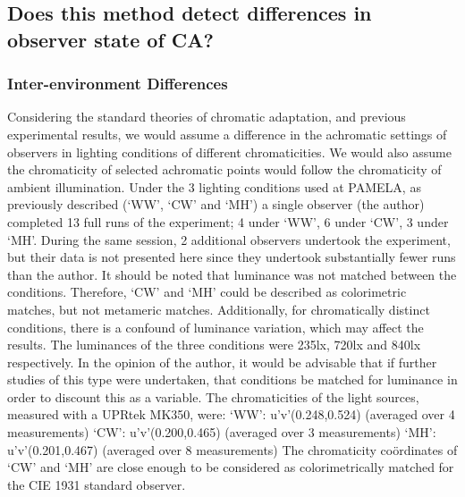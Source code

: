\subsection{Does this method detect differences in observer state of CA?}
\subsubsection{Inter-environment Differences}

Considering the standard theories of chromatic adaptation, and previous experimental results, we would assume a difference in the achromatic settings of observers in lighting conditions of different chromaticities. We would also assume the chromaticity of selected achromatic points would follow the chromaticity of ambient illumination.
Under the 3 lighting conditions used at PAMELA, as previously described (`WW', `CW' and `MH') a single observer (the author) completed 13 full runs of the experiment; 4 under `WW', 6 under `CW', 3 under `MH'. During the same session, 2 additional observers undertook the experiment, but their data is not presented here since they undertook substantially fewer runs than the author. It should be noted that luminance was not matched between the conditions. Therefore, `CW' and `MH' could be described as colorimetric matches, but not metameric matches. Additionally, for chromatically distinct conditions, there is a confound of luminance variation, which may affect the results. The luminances of the three conditions were 235lx, 720lx and 840lx respectively. In the opinion of the author, it would be advisable that if further studies of this type were undertaken, that conditions be matched for luminance in order to discount this as a variable. 
The chromaticities of the light sources, measured with a UPRtek MK350, were:
`WW': 	u'v'(0.248,0.524) (averaged over 4 measurements)
`CW': 	u'v'(0.200,0.465) (averaged over 3 measurements)
`MH': 	u'v'(0.201,0.467) (averaged over 8 measurements)
The chromaticity coördinates of `CW' and `MH' are close enough to be considered as colorimetrically matched for the CIE 1931 standard observer.


